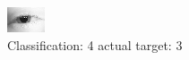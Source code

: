 \begin{figure}[h!]
\begin{center}
\includegraphics[width=0.60\columnwidth]{figures/ID107_class_4_target_3.png}
\end{center}
\caption{ Classification: 4 actual target: 3}
\label{fig:ID107_class_4_target_3}
\end{figure}
